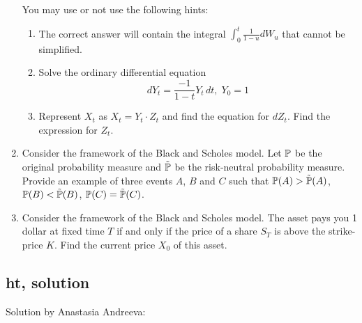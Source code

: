\documentclass[12pt, a4paper]{article}
\begin{document}
\begin{enumerate}
You may use or not use the following hints:

\begin{enumerate}
\item The correct answer will contain the integral $\int_0^t \frac{1}{1 - u} dW_u$ that cannot be simplified.
\item Solve the ordinary differential equation
\begin{equation}
dY_t = \frac{-1}{1 - t}Y_t \, dt, \; Y_0 = 1
\end{equation}
\item Represent $X_t$ as $X_t = Y_t \cdot Z_t$ and find the equation for $dZ_t$. Find the expression for $Z_t$.
\end{enumerate}

\item Consider the framework of the Black and Scholes model. Let $\P$ be the original probability measure and $\tilde{\P}$ be the risk-neutral probability measure. Provide an example of three events $A$, $B$ and $C$ such that $\P(A) > \tilde{\P}(A)$,  $\P(B) < \tilde{\P}(B)$, $\P(C) = \tilde{\P}(C)$.

\item Consider the framework of the Black and Scholes model. The asset pays you 1 dollar at fixed time $T$ if and only if the price of a share $S_T$ is above the strike-price $K$. Find the current price $X_0$ of this asset.

\end{enumerate}


\subsection{ht, solution}

Solution by Anastasia Andreeva:
\end{document}
